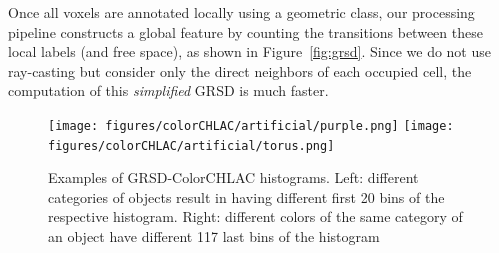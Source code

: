 \documentclass[conference]{sty/IEEEtran}
\begin{document}
Once all voxels are annotated locally using a geometric class, our
processing pipeline constructs a global feature by counting the transitions
between these local labels (and free space), as shown in Figure~\ref{fig:grsd}.
Since we do not use ray-casting but consider only the direct neighbors
of each occupied cell, the computation of this \emph{simplified} GRSD is much faster.

\begin{figure}[htb!]
  \begin{center}
    \texttt{[image: figures/colorCHLAC/artificial/purple.png]}
    \texttt{[image: figures/colorCHLAC/artificial/torus.png]}
    \caption{Examples of GRSD-ColorCHLAC histograms. Left: different categories
of objects result in having different first 20 bins of the respective histogram.
Right: different colors of the same category of an object have different 117 last bins
of the histogram}
    \label{fig:grsd_cchlac}
  \end{center}
\end{figure}
\end{document}
